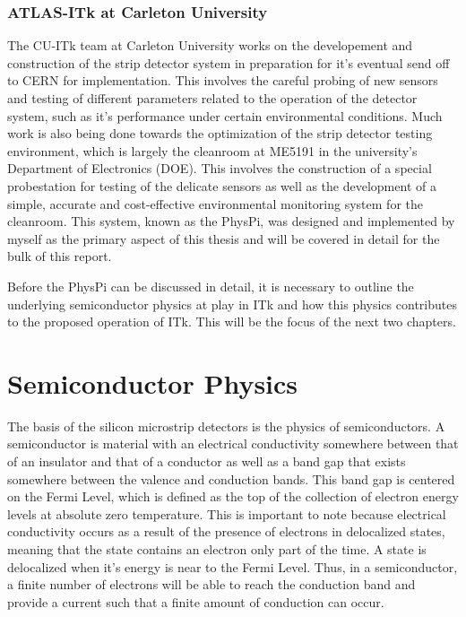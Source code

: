 \documentclass[letterpaper, 11pt]{report}
\begin{document}
\subsection{ATLAS-ITk at Carleton University}

The CU-ITk team at Carleton University works on the developement and construction of the strip detector system in preparation for it's eventual send off to CERN for implementation.  This involves the careful probing of new sensors and testing of different parameters related to the operation of the detector system, such as it's performance under certain environmental conditions.  Much work is also being done towards the optimization of the strip detector testing environment, which is largely the cleanroom at ME5191 in the university's Department of Electronics (DOE).  This involves the construction of a special probestation for testing of the delicate sensors as well as the development of a simple, accurate and cost-effective environmental monitoring system for the cleanroom.  This system, known as the PhysPi, was designed and implemented by myself as the primary aspect of this thesis and will be covered in detail for the bulk of this report.  

Before the PhysPi can be discussed in detail, it is necessary to outline the underlying semiconductor physics at play in ITk and how this physics contributes to the proposed operation of ITk.  This will be the focus of the next two chapters.

\chapter{Semiconductor Physics}

The basis of the silicon microstrip detectors is the physics of semiconductors.  A semiconductor is material with an electrical conductivity somewhere between that of an insulator and that of a conductor as well as a band gap that exists somewhere between the valence and conduction bands.  This band gap is centered on the Fermi Level, which is defined as the top of the collection of electron energy levels at absolute zero temperature.  This is important to note because electrical conductivity occurs as a result of the presence of electrons in delocalized states, meaning that the state contains an electron only part of the time.  A state is delocalized when it’s energy is near to the Fermi Level.  Thus, in a semiconductor, a finite number of electrons will be able to reach the conduction band and provide a current such that a finite amount of conduction can occur.
\end{document}
